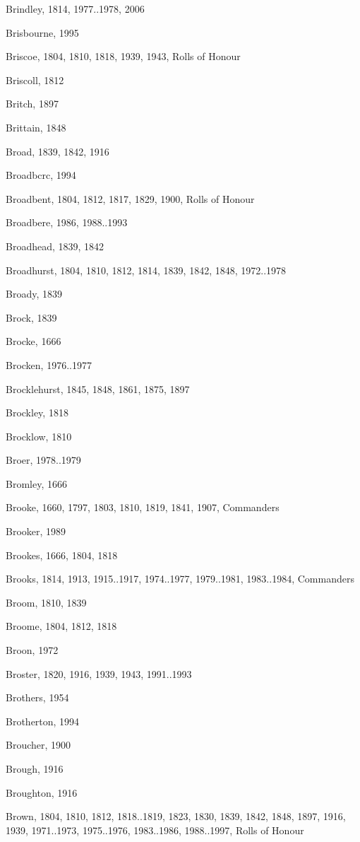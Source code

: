 {\begin{theindex}
\item Brindley, 1814, 1977..1978, 2006
\item Brisbourne, 1995
\item Briscoe, 1804, 1810, 1818, 1939, 1943, Rolls of Honour
\item Briscoll, 1812
\item Britch, 1897
\item Brittain, 1848
\item Broad, 1839, 1842, 1916
\item Broadbcrc, 1994
\item Broadbent, 1804, 1812, 1817, 1829, 1900, Rolls of Honour
\item Broadbere, 1986, 1988..1993
\item Broadhead, 1839, 1842
\item Broadhurst, 1804, 1810, 1812, 1814, 1839, 1842, 1848, 1972..1978
\item Broady, 1839
\item Brock, 1839
\item Brocke, 1666
\item Brocken, 1976..1977
\item Brocklehurst, 1845, 1848, 1861, 1875, 1897
\item Brockley, 1818
\item Brocklow, 1810
\item Broer, 1978..1979
\item Bromley, 1666
\item Brooke, 1660, 1797, 1803, 1810, 1819, 1841, 1907, Commanders
\item Brooker, 1989
\item Brookes, 1666, 1804, 1818
\item Brooks, 1814, 1913, 1915..1917, 1974..1977, 1979..1981, 1983..1984, Commanders
\item Broom, 1810, 1839
\item Broome, 1804, 1812, 1818
\item Broon, 1972
\item Broster, 1820, 1916, 1939, 1943, 1991..1993
\item Brothers, 1954
\item Brotherton, 1994
\item Broucher, 1900
\item Brough, 1916
\item Broughton, 1916
\item Brown, 1804, 1810, 1812, 1818..1819, 1823, 1830, 1839, 1842, 1848, 1897, 1916, 1939, 1971..1973, 1975..1976, 1983..1986, 1988..1997, Rolls of Honour

\end{theindex}}

